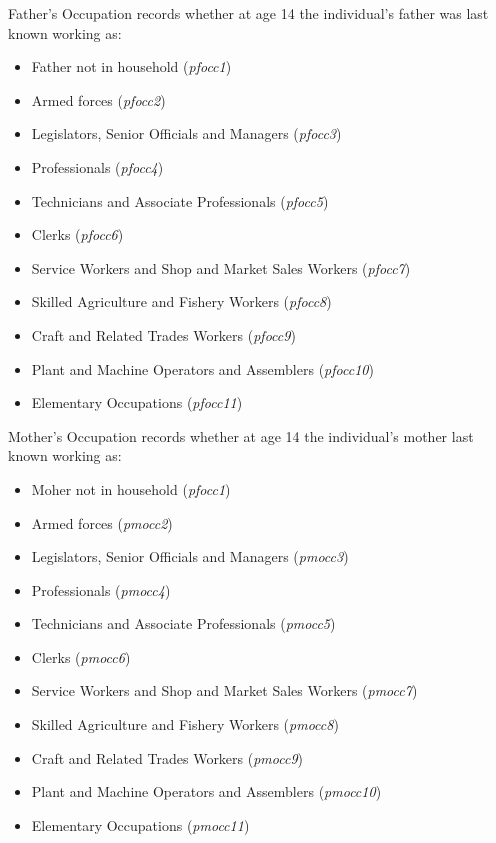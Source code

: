 \documentclass[12pt, a4paper]{article}
\begin{document}
Father’s Occupation records whether at age 14 the individual’s father was last known working as:
\begin{itemize}
  \item Father not in household (\textit{p\textunderscore{}focc1})
  \item Armed forces (\textit{p\textunderscore{}focc2})
  \item Legislators, Senior Officials and Managers (\textit{p\textunderscore{}focc3})
  \item Professionals (\textit{p\textunderscore{}focc4})
  \item Technicians and Associate Professionals (\textit{p\textunderscore{}focc5})
  \item Clerks (\textit{p\textunderscore{}focc6})
  \item Service Workers and Shop and Market Sales Workers (\textit{p\textunderscore{}focc7})
  \item Skilled Agriculture and Fishery Workers (\textit{p\textunderscore{}focc8})
  \item Craft and Related Trades Workers (\textit{p\textunderscore{}focc9})
  \item Plant and Machine Operators and Assemblers (\textit{p\textunderscore{}focc10})
  \item Elementary Occupations (\textit{p\textunderscore{}focc11})
\end{itemize}  
 
Mother’s Occupation records whether at age 14 the individual’s mother last known working as:
\begin{itemize}
  \item Moher not in household (\textit{p\textunderscore{}focc1})
  \item Armed forces (\textit{p\textunderscore{}mocc2})
  \item Legislators, Senior Officials and Managers (\textit{p\textunderscore{}mocc3})
  \item Professionals (\textit{p\textunderscore{}mocc4})
  \item Technicians and Associate Professionals (\textit{p\textunderscore{}mocc5})
  \item Clerks (\textit{p\textunderscore{}mocc6})
  \item Service Workers and Shop and Market Sales Workers (\textit{p\textunderscore{}mocc7})
  \item Skilled Agriculture and Fishery Workers (\textit{p\textunderscore{}mocc8})
  \item Craft and Related Trades Workers (\textit{p\textunderscore{}mocc9})
  \item Plant and Machine Operators and Assemblers (\textit{p\textunderscore{}mocc10})
  \item Elementary Occupations (\textit{p\textunderscore{}mocc11})
\end{itemize}  
  
\end{document}
